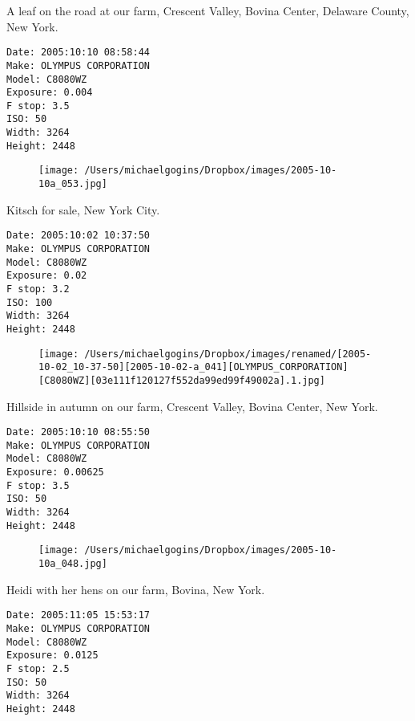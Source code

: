 \documentclass[11pt,letter,DIV=14,paper=landscape]{scrbook}
\begin{document}
\clearpage
\noindent A leaf on the road at our farm, Crescent Valley, Bovina Center, Delaware County, New York.
\noindent
\begin{lstlisting}
Date: 2005:10:10 08:58:44
Make: OLYMPUS CORPORATION
Model: C8080WZ
Exposure: 0.004
F stop: 3.5
ISO: 50
Width: 3264
Height: 2448
\end{lstlisting}
\clearpage

\begin{figure}
\texttt{[image: /Users/michaelgogins/Dropbox/images/2005-10-10a\_053.jpg]}
\end{figure}
    
\clearpage
\noindent Kitsch for sale, New York City.
\noindent
\begin{lstlisting}
Date: 2005:10:02 10:37:50
Make: OLYMPUS CORPORATION
Model: C8080WZ
Exposure: 0.02
F stop: 3.2
ISO: 100
Width: 3264
Height: 2448
\end{lstlisting}
\clearpage

\begin{figure}
\texttt{[image: /Users/michaelgogins/Dropbox/images/renamed/[2005-10-02\_10-37-50][2005-10-02-a\_041][OLYMPUS\_CORPORATION][C8080WZ][03e111f120127f552da99ed99f49002a].1.jpg]}
\end{figure}
    
\clearpage
\noindent Hillside in autumn on our farm, Crescent Valley, Bovina Center, New York.
\noindent
\begin{lstlisting}
Date: 2005:10:10 08:55:50
Make: OLYMPUS CORPORATION
Model: C8080WZ
Exposure: 0.00625
F stop: 3.5
ISO: 50
Width: 3264
Height: 2448
\end{lstlisting}
\clearpage

\begin{figure}
\texttt{[image: /Users/michaelgogins/Dropbox/images/2005-10-10a\_048.jpg]}
\end{figure}
    
\clearpage
\noindent Heidi with her hens on our farm, Bovina, New York.
\noindent
\begin{lstlisting}
Date: 2005:11:05 15:53:17
Make: OLYMPUS CORPORATION
Model: C8080WZ
Exposure: 0.0125
F stop: 2.5
ISO: 50
Width: 3264
Height: 2448
\end{lstlisting}
\clearpage
\end{document}
